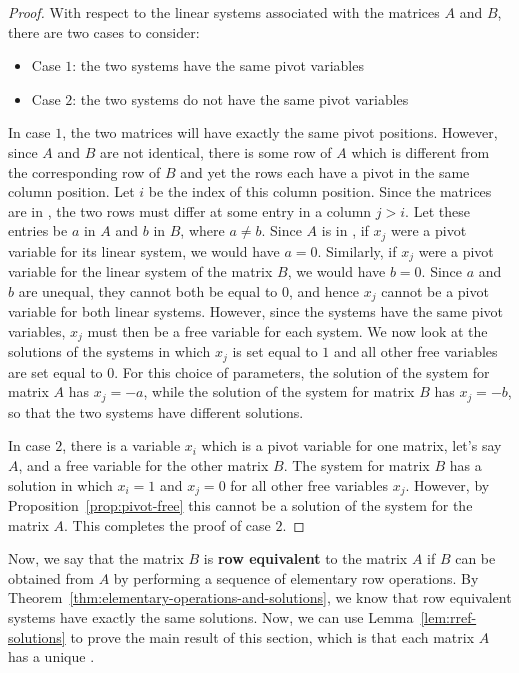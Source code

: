 \begin{proof}
  With respect to the linear systems associated with the matrices $A$ and $B$, there are two cases to consider:
  \begin{itemize}
  \item Case $1$: the two systems have the same pivot variables
  \item Case $2$: the two systems do not have the same pivot variables
  \end{itemize}
  In case $1$, the two matrices will have exactly the same pivot
  positions. However, since $A$ and $B$ are not identical, there is
  some row of $A$ which is different from the corresponding row of $B$
  and yet the rows each have a pivot in the same column position. Let
  $i$ be the index of this column position. Since the matrices are in
  {\rref}, the two rows must differ at some entry in a column
  $j>i$. Let these entries be $a$ in $A$ and $b$ in $B$, where
  $a \neq b$. Since $A$ is in {\rref}, if $x_j$ were a pivot variable
  for its linear system, we would have $a=0$. Similarly, if $x_j$ were
  a pivot variable for the linear system of the matrix $B$, we would
  have $b=0$. Since $a$ and $b$ are unequal, they cannot both be equal
  to $0$, and hence $x_j$ cannot be a pivot variable for both linear
  systems. However, since the systems have the same pivot variables,
  $x_j$ must then be a free variable for each system. We now look at
  the solutions of the systems in which $x_j$ is set equal to $1$ and
  all other free variables are set equal to $0$. For this choice of
  parameters, the solution of the system for matrix $A$ has $x_j=-a$,
  while the solution of the system for matrix $B$ has $x_j=-b$, so
  that the two systems have different solutions.

  In case $2$, there is a variable $x_i$ which is a pivot variable for
  one matrix, let's say $A$, and a free variable for the other matrix
  $B$. The system for matrix $B$ has a solution in which $x_i=1$ and
  $x_j=0$ for all other free variables $x_j$. However, by
  Proposition~\ref{prop:pivot-free} this cannot be a solution of the
  system for the matrix $A$. This completes the proof of case $2$.
\end{proof}

Now, we say that the matrix $B$ is \textbf{row equivalent}%
%
 to the matrix $A$ if $B$ can be obtained from
$A$ by performing a sequence of elementary row operations. By
Theorem~\ref{thm:elementary-operations-and-solutions}, we know that row
equivalent systems have exactly the same solutions. Now, we can use
Lemma~\ref{lem:rref-solutions} to prove the main result of this
section, which is that each matrix $A$ has a unique {\rref}.

